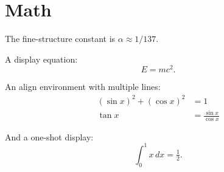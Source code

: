 \documentclass{article}
\begin{document}
\section{Math}

The fine-structure constant is $\alpha \approx 1/137$.

A display equation:
\begin{equation}
  E = mc^2.
\end{equation}

An align environment with multiple lines:
\begin{align*}
  (\sin x)^2 + (\cos x)^2 &= 1 \\
  \tan x                  &= \frac{\sin x}{\cos x}
\end{align*}

And a one-shot display: \[ \int_0^1 x \, dx = \tfrac{1}{2}. \]
\end{document}

